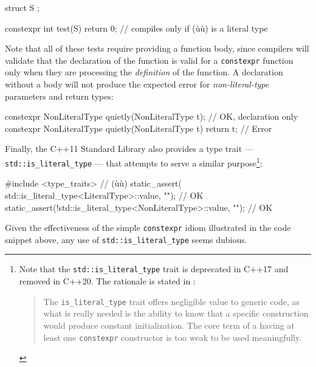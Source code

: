 \begin{enumerate}
{\begin{emcppshiddenlisting}[emcppsbatch=t1] %
struct S {};
\end{emcppshiddenlisting}
\begin{emcppslisting}[emcppsbatch=t1]
constexpr int test(S) { return 0; }  // compiles only if (ù{}ù) is a literal type
\end{emcppslisting}
    

\noindent Note that all of these tests require providing a function body, since
compilers will validate that the declaration of the function is valid
for a \lstinline!constexpr! function only when they are processing the
\emph{definition} of the function. A declaration without a body will not
produce the expected error for \emph{non-literal-type} parameters and
return types:

\begin{emcppslisting}[emcppsbatch=e9] %
constexpr NonLiteralType quietly(NonLiteralType t);  // OK, declaration only
constexpr NonLiteralType quietly(NonLiteralType t) { return t; }  // Error
\end{emcppslisting}
    

\noindent Finally, the C++11 Standard Library also provides a type trait ---
\lstinline!std::is_literal_type! --- that attempts to serve a similar
purpose{\cprotect\footnote{Note that the \lstinline!std::is_literal_type!
trait is deprecated in C++17 and removed in C++20. The rationale is
  stated in \cite{meredith16}:

  \begin{quote}
  The \lstinline!is_literal_type! trait offers negligible value to
  generic code, as what is really needed is the ability to know that a
  specific construction would produce constant initialization. The core
  term of a  having at least one \lstinline!constexpr!
  constructor is too weak to be used meaningfully.
  \end{quote}}}:

\begin{emcppslisting}[emcppsbatch=e9] %
#include <type_traits>  // (ù{}ù)
static_assert( std::is_literal_type<LiteralType>::value, "");     // OK
static_assert(!std::is_literal_type<NonLiteralType>::value, "");  // OK
\end{emcppslisting}
    

\noindent Given the effectiveness of the simple \lstinline!constexpr!
 idiom illustrated in the code snippet above, any
use of \lstinline!std::is_literal_type! seems dubious.

}
\end{enumerate}
